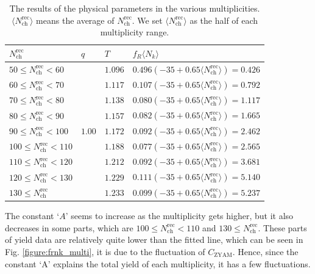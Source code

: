 \documentclass[jkps,fleqn,showpacs,showkeys]{revtex4}
\begin{document}
\begin{table}[ht]
  \renewcommand{\arraystretch}{1.5}
  \begin{tabular}{C{3cm} | C{1.5cm} | C{1.5cm} | C{5.5cm}}
  \hline
  $N_{\text{ch}}^{\text{rec}}$         &  $q$   &   $T$   & $f_R\langle N_k \rangle$ \\ \hline\hline
  $50\leq N_{\text{ch}}^{\text{rec}}<60$   &        & $1.096$ & $0.496(-35+0.65\langle N_{\text{ch}}^{\text{rec}}\rangle) = 0.426$ \\   
  $60\leq N_{\text{ch}}^{\text{rec}}<70$   &        & $1.117$ & $0.107(-35+0.65\langle N_{\text{ch}}^{\text{rec}}\rangle) = 0.792$ \\   
  $70\leq N_{\text{ch}}^{\text{rec}}<80$   &        & $1.138$ & $0.080(-35+0.65\langle N_{\text{ch}}^{\text{rec}}\rangle) = 1.117$ \\   
  $80\leq N_{\text{ch}}^{\text{rec}}<90$   &        & $1.157$ & $0.082(-35+0.65\langle N_{\text{ch}}^{\text{rec}}\rangle) = 1.665$ \\   
  $90\leq N_{\text{ch}}^{\text{rec}}<100$  & $1.00$ & $1.172$ & $0.092(-35+0.65\langle N_{\text{ch}}^{\text{rec}}\rangle) = 2.462$ \\   
  $100\leq N_{\text{ch}}^{\text{rec}}<110$ &        & $1.188$ & $0.077(-35+0.65\langle N_{\text{ch}}^{\text{rec}}\rangle) = 2.565$ \\   
  $110\leq N_{\text{ch}}^{\text{rec}}<120$ &        & $1.212$ & $0.092(-35+0.65\langle N_{\text{ch}}^{\text{rec}}\rangle) = 3.681$ \\   
  $120\leq N_{\text{ch}}^{\text{rec}}<130$ &        & $1.229$ & $0.111(-35+0.65\langle N_{\text{ch}}^{\text{rec}}\rangle) = 5.140$ \\   
  $130\leq N_{\text{ch}}^{\text{rec}}$     &        & $1.233$ & $0.099(-35+0.65\langle N_{\text{ch}}^{\text{rec}}\rangle) = 5.237$ \\ \hline
  \end{tabular}
  \caption{The results of the physical parameters in the various multiplicities.
  $\langle N_{\text{ch}}^{\text{rec}}\rangle$ means the average of $N_{\text{ch}}^{\text{rec}}$.
  We set $\langle N_{\text{ch}}^{\text{rec}}\rangle$ as the half of each multiplicity range.
  }
  \label{table:variousmulti}
\end{table}

The constant `$A$' seems to increase as the multiplicity gets higher, but it also decreases in some parts, which are $100\leq N_{\text{ch}}^{\text{rec}}<110$ and $130\leq N_{\text{ch}}^{\text{rec}}$.
These parts of yield data are relatively quite lower than the fitted line, which can be seen in Fig. \ref{figure:frnk_multi}, it is due to the fluctuation of $C_{\text{ZYAM}}$.
Hence, since the constant `A' explains the total yield of each multiplicity, it has a few fluctuations. 
\end{document}
